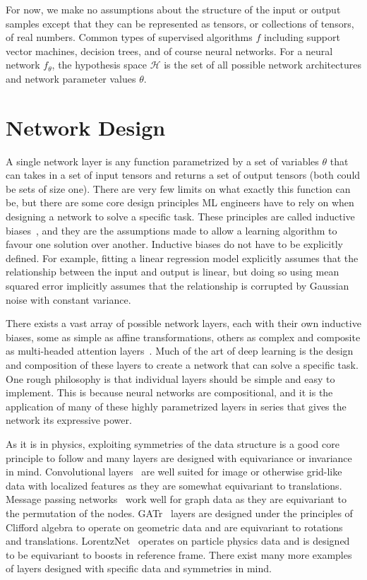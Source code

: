 For now, we make no assumptions about the structure of the input or output samples except that they can be represented as tensors, or collections of tensors, of real numbers.
Common types of supervised algorithms $f$ including support vector machines, decision trees, and of course neural networks.
For a neural network $f_{\theta}$, the hypothesis space $\mathcal{H}$ is the set of all possible network architectures and network parameter values $\theta$.

\section{Network Design}

A single network layer is any function parametrized by a set of variables $\theta$ that can takes in a set of input tensors and returns a set of output tensors (both could be sets of size one).
There are very few limits on what exactly this function can be, but there are some core design principles ML engineers have to rely on when designing a network to solve a specific task.
These principles are called inductive biases~\cite{InductiveBiases1, InductiveBiases2}, and they are the assumptions made to allow a learning algorithm to favour one solution over another.
Inductive biases do not have to be explicitly defined.
For example, fitting a linear regression model explicitly assumes that the relationship between the input and output is linear, but doing so using mean squared error implicitly assumes that the relationship is corrupted by Gaussian noise with constant variance.

There exists a vast array of possible network layers, each with their own inductive biases, some as simple as affine transformations, others as complex and composite as multi-headed attention layers~\cite{Attention}.
Much of the art of deep learning is the design and composition of these layers to create a network that can solve a specific task.
One rough philosophy is that individual layers should be simple and easy to implement.
This is because neural networks are compositional, and it is the application of many of these highly parametrized layers in series that gives the network its expressive power.

As it is in physics, exploiting symmetries of the data structure is a good core principle to follow and many layers are designed with equivariance or invariance in mind.
Convolutional layers~\cite{DeepLearning} are well suited for image or otherwise grid-like data with localized features as they are somewhat equivariant to translations.
Message passing networks~\cite{NeuralMessagePassing} work well for graph data as they are equivariant to the permutation of the nodes.
GATr~\cite{GeometricAlgebraTransformer} layers are designed under the principles of Clifford algebra to operate on geometric data and are equivariant to rotations and translations.
LorentzNet~\cite{LorentzNet} operates on particle physics data and is designed to be equivariant to boosts in reference frame.
There exist many more examples of layers designed with specific data and symmetries in mind.

